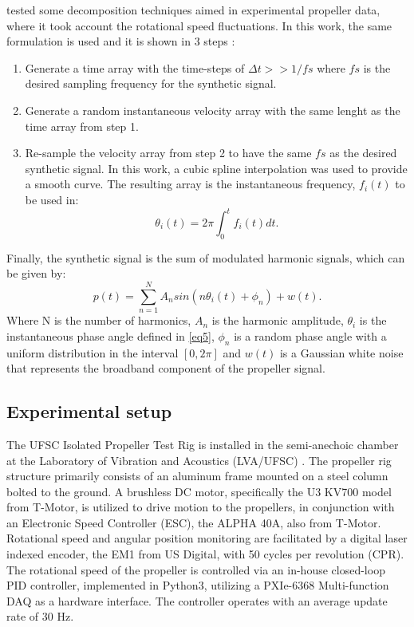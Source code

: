 \documentclass[10pt,fleqn,a4paper,twoside]{article}
\begin{document}
\cite{bonomo} tested some decomposition techniques aimed in experimental propeller data, where it took account the rotational speed fluctuations. In this work, the same formulation is used and it is shown in 3 steps \citep{bonomo}:
\begin{enumerate}
    \item Generate a time array with the time-steps of $\Delta t >> 1/ fs$ where $fs$ is the desired sampling frequency for the synthetic signal.
    \item Generate a random instantaneous velocity array with the same lenght as the time array from step 1.
    \item Re-sample the velocity array from step 2 to have the same $fs$ as the desired synthetic signal. In this work, a cubic spline interpolation was used to provide a smooth curve. The resulting array  is the instantaneous frequency, $f_i(t)$ to be used in:
    \begin{equation}
        \label{eq5}
        \theta_i (t)=2\pi \int_{0}^{t}f_i (t)dt.
    \end{equation}
\end{enumerate} 

Finally, the synthetic signal is the sum of modulated harmonic signals, which can be given by:
\begin{equation}
    \label{eq6}
    p(t) = \sum_{n=1}^{N} A_n sin(n\theta_i (t) + \phi_n) + w(t).
\end{equation}
Where N is the number of harmonics, $A_n$ is the harmonic amplitude, $\theta_i$ is the instantaneous phase angle defined in \ref{eq5}, $\phi_n$ is a random phase angle with a uniform distribution in the interval $[0,2\pi]$ and $w(t)$ is a Gaussian white noise that represents the broadband component of the propeller signal.

\subsection{Experimental setup}
The UFSC Isolated Propeller Test Rig is installed in the semi-anechoic chamber at the Laboratory of Vibration and Acoustics (LVA/UFSC) \citep{Augusto}. The propeller rig structure primarily consists of an aluminum frame mounted on a steel column bolted to the ground. A brushless DC motor, specifically the U3 KV700 model from T-Motor, is utilized to drive
motion to the propellers, in conjunction with an Electronic Speed Controller (ESC), the ALPHA 40A, also from T-Motor.
Rotational speed and angular position monitoring are facilitated by a digital laser indexed encoder, the EM1 from US
Digital, with 50 cycles per revolution (CPR).
The rotational speed of the propeller is controlled via an in-house closed-loop PID controller, implemented in
Python3, utilizing a PXIe-6368 Multi-function DAQ as a hardware interface. The controller operates with an average
update rate of 30 Hz.
\end{document}
